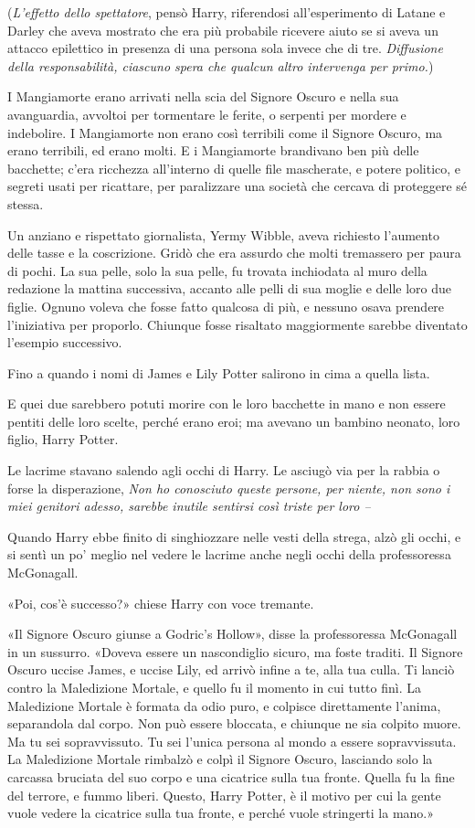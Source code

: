 (\textit{L’effetto dello spettatore}, pensò Harry, riferendosi all’esperimento di Latane e Darley che aveva mostrato che era più probabile ricevere aiuto se si aveva un attacco epilettico in presenza di una persona sola invece che di tre. \textit{Diffusione della responsabilità, ciascuno spera che qualcun altro intervenga per primo.})

I Mangiamorte erano arrivati nella scia del Signore Oscuro e nella sua avanguardia, avvoltoi per tormentare le ferite, o serpenti per mordere e indebolire. I Mangiamorte non erano così terribili come il Signore Oscuro, ma erano terribili, ed erano molti. E i Mangiamorte brandivano ben più delle bacchette; c’era ricchezza all’interno di quelle file mascherate, e potere politico, e segreti usati per ricattare, per paralizzare una società che cercava di proteggere sé stessa.

Un anziano e rispettato giornalista, Yermy Wibble, aveva richiesto l’aumento delle tasse e la coscrizione. Gridò che era assurdo che molti tremassero per paura di pochi. La sua pelle, solo la sua pelle, fu trovata inchiodata al muro della redazione la mattina successiva, accanto alle pelli di sua moglie e delle loro due figlie. Ognuno voleva che fosse fatto qualcosa di più, e nessuno osava prendere l’iniziativa per proporlo. Chiunque fosse risaltato maggiormente sarebbe diventato l’esempio successivo.

Fino a quando i nomi di James e Lily Potter salirono in cima a quella lista.

E quei due sarebbero potuti morire con le loro bacchette in mano e non essere pentiti delle loro scelte, perché erano eroi; ma avevano un bambino neonato, loro figlio, Harry Potter.

Le lacrime stavano salendo agli occhi di Harry. Le asciugò via per la rabbia o forse la disperazione, \textit{Non ho conosciuto queste persone, per niente, non sono i miei genitori adesso, sarebbe inutile sentirsi così triste per loro –}

Quando Harry ebbe finito di singhiozzare nelle vesti della strega, alzò gli occhi, e si sentì un po’ meglio nel vedere le lacrime anche negli occhi della professoressa McGonagall.

«Poi, cos’è successo?» chiese Harry con voce tremante.

«Il Signore Oscuro giunse a Godric’s Hollow», disse la professoressa McGonagall in un sussurro. «Doveva essere un nascondiglio sicuro, ma foste traditi. Il Signore Oscuro uccise James, e uccise Lily, ed arrivò infine a te, alla tua culla. Ti lanciò contro la Maledizione Mortale, e quello fu il momento in cui tutto finì. La Maledizione Mortale è formata da odio puro, e colpisce direttamente l’anima, separandola dal corpo. Non può essere bloccata, e chiunque ne sia colpito muore. Ma tu sei sopravvissuto. Tu sei l’unica persona al mondo a essere sopravvissuta. La Maledizione Mortale rimbalzò e colpì il Signore Oscuro, lasciando solo la carcassa bruciata del suo corpo e una cicatrice sulla tua fronte. Quella fu la fine del terrore, e fummo liberi. Questo, Harry Potter, è il motivo per cui la gente vuole vedere la cicatrice sulla tua fronte, e perché vuole stringerti la mano.»

